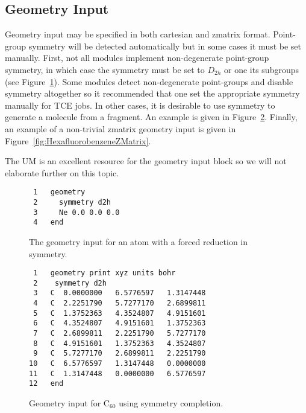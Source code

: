 \documentclass[letterpaper,12pt]{article}
\begin{document}
\newpage

\subsection{Geometry Input}\label{sec:GeometryInput}

Geometry input may be specified in both cartesian and zmatrix format.  Point-group symmetry will be detected automatically but in some cases it must be set manually.  First, not all modules implement non-degenerate point-group symmetry, in which case the symmetry must be set to $D_{2h}$ or one its subgroups (see Figure~\ref{fig:NeonGeometry}).  Some modules detect non-degenerate point-groups and disable symmetry altogether so it recommended that one set the appropriate symmetry manually for TCE jobs.  In other cases, it is desirable to use symmetry to generate a molecule from a fragment.  An example is given in Figure~\ref{fig:C60geometry}.  Finally, an example of a non-trivial zmatrix geometry input is given in Figure~\ref{fig:HexafluorobenzeneZMatrix}.

The UM is an excellent resource for the geometry input block so we will not elaborate further on this topic.

\begin{figure}
    \caption{The geometry input for an atom with a forced reduction in symmetry.}
    \label{fig:NeonGeometry}
    \begin{verbatim}
 1   geometry
 2     symmetry d2h
 3     Ne 0.0 0.0 0.0
 4   end
    \end{verbatim}
\end{figure}

\begin{figure}
    \caption{Geometry input for C$_{60}$ using symmetry completion.}
    \label{fig:C60geometry}
    \begin{verbatim}
 1   geometry print xyz units bohr
 2    symmetry d2h
 3   C  0.0000000   6.5776597   1.3147448
 4   C  2.2251790   5.7277170   2.6899811
 5   C  1.3752363   4.3524807   4.9151601
 6   C  4.3524807   4.9151601   1.3752363
 7   C  2.6899811   2.2251790   5.7277170
 8   C  4.9151601   1.3752363   4.3524807
 9   C  5.7277170   2.6899811   2.2251790
10   C  6.5776597   1.3147448   0.0000000
11   C  1.3147448   0.0000000   6.5776597
12   end
    \end{verbatim}
\end{figure}
\end{document}
